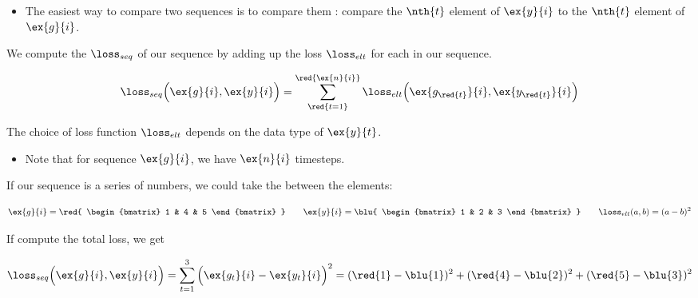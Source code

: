        \begin{itemize}
            \item The easiest way to compare two sequences is to compare them : compare the $\nth{t}$ element of $\ex{y}{i}$ to the $\nth{t}$ element of  $\ex{g}{i}$.\\
        \end{itemize}

        \begin{definition}
            We compute the  $\loss_{seq}$ of our sequence by adding up the loss $\loss_{elt}$ for each  in our sequence.

            \begin{equation*}
                \loss_{seq} \Big(
                    \ex{g}{i}, \ex{y}{i} 
                \Big) = 
                \sum_{ \red{t=1} }^{\red{\ex{n}{i}}} 
                \loss_{elt} \Big( 
                    \ex{g_{\red{t}} }{i}, \ex{y_{\red{t}} }{i} 
                \Big)
            \end{equation*}

            The choice of loss function $\loss_{elt}$ depends on the data type of $\ex{y}{t}$.
        \end{definition}

        \begin{itemize}
            \item Note that for sequence $\ex{g}{i}$, we have $\ex{n}{i}$ timesteps.
        \end{itemize}

        \miniex If our sequence is a series of numbers, we could take the  between the elements:

        \begin{equation}
            \ex{g}{i} = 
            \red{
            \begin{bmatrix}
                1 & 4 & 5 
            \end{bmatrix}
            }
            \qquad
            \ex{y}{i} =
            \blu{
            \begin{bmatrix}
                1 & 2 & 3 
            \end{bmatrix}
            }
            \qquad 
            \loss_{elt}(a,b) = (a-b)^2
        \end{equation}

        If compute the total loss, we get

        \begin{equation*}
            \loss_{seq} \Big(
                \ex{g}{i}, \ex{y}{i} 
            \Big) 
            = 
            \sum_{ t=1 }^{3} \Big( 
                \ex{g_{t} }{i}- \ex{y_{t} }{i} 
            \Big)^2 
            =  
            (\red{1}-\blu{1})^2 + (\red{4}-\blu{2})^2 +
            (\red{5}-\blu{3})^2 
        \end{equation*}

